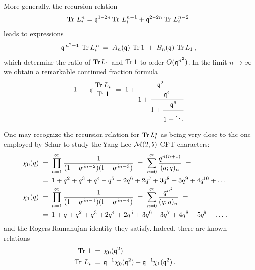 \documentclass[12pt]{amsart}
\begin{document}
More generally, the recursion relation 
\begin{equation}\label{eq:pentarec}
	\operatorname{Tr} \,L_i^n =\mathfrak{q}^{1-2n} \operatorname{Tr}\, L^{n-1}_i + \mathfrak{q}^{2-2n} \operatorname{Tr}\,L^{n-2}_i\,
\end{equation}
leads to expressions
\begin{equation}\label{eq:ABdef}
  \mathfrak{q}^{\,n^2-1}\, \operatorname{Tr} L_i^{\,n} \;=\; A_n(\mathfrak{q})\, \operatorname{Tr} 1 \;+\; B_n(\mathfrak{q})\, \operatorname{Tr} L_1 \,,
\end{equation}
which determine the ratio of  $\operatorname{Tr} L_1$ and $\operatorname{Tr} 1$ to order $O(\mathfrak{q}^{n^2})$. In the limit $n \to \infty$ we obtain a remarkable 
continued fraction formula
\begin{equation}
	1 \;-\; \mathfrak{q}\,\frac{\operatorname{Tr}\,L_{i}}{\operatorname{Tr}\,1}
\;=\;
1 + \cfrac{\mathfrak{q}^{2}}{1 + \cfrac{\mathfrak{q}^{4}}{1 + \cfrac{\mathfrak{q}^{6}}{1 + \ddots}}}
\end{equation}

One may recognize the recursion relation for $\operatorname{Tr} L_i^a$ as being very close to the one employed by Schur to study the Yang-Lee ${\mathcal M}(2,5)$ CFT characters:
\begin{align}
\chi_0(q) &\;=\; \prod_{n=1}^{\infty} \frac{1}{(1-q^{5n-2})(1-q^{5n-3})}
         \;=\; \sum_{n=0}^{\infty} \frac{q^{n(n+1)}}{(q;q)_n}
         \;=\; \cr &\;=\; 1 + q^2 + q^3 + q^4 + q^5 + 2q^6 + 2q^7 + 3q^8 + 3q^9 + 4q^{10} + \ldots \cr
\chi_1(q) &\;=\; \prod_{n=1}^{\infty} \frac{1}{(1-q^{5n-1})(1-q^{5n-4})}
         \;=\; \sum_{n=0}^{\infty} \frac{q^{n^2}}{(q;q)_n}
         \;=\; \cr &\;=\; 1 + q + q^2 + q^3 + 2q^4 + 2q^5 + 3q^6 + 3q^7 + 4q^8 + 5q^9 + \ldots \, .
\end{align}
 and the Rogers-Ramanujan identity they satisfy. Indeed, there are known relations
\begin{align}
\operatorname{Tr}\, 1 &\;=\;  \chi_0(\mathfrak{q}^2)  \cr
\operatorname{Tr}\, L_i &\;=\; \mathfrak{q}^{-1} \chi_0(\mathfrak{q}^2) - \mathfrak{q}^{-1} \chi_1(\mathfrak{q}^2) \, .
\end{align}
\end{document}
